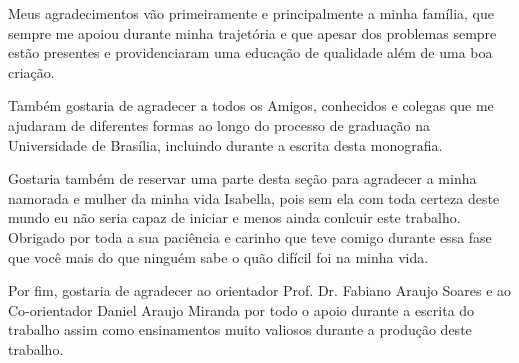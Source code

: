 \begin{agradecimentos}
Meus agradecimentos vão primeiramente e principalmente a minha família, que sempre me apoiou durante minha trajetória e que apesar dos problemas sempre estão presentes e providenciaram uma educação de qualidade além de uma boa criação.

Também gostaria de agradecer a todos os Amigos, conhecidos e colegas que me ajudaram de diferentes formas ao longo do processo de graduação na Universidade de Brasília, incluindo durante a escrita desta monografia.

Gostaria também de reservar uma parte desta seção para agradecer a minha namorada e mulher da minha vida Isabella, pois sem ela com toda certeza deste mundo eu não seria capaz de iniciar e menos ainda conlcuir este trabalho. Obrigado por toda a sua paciência e carinho que teve comigo durante essa fase que você mais do que ninguém sabe o quão difícil foi na minha vida.

Por fim, gostaria de agradecer ao orientador Prof. Dr. Fabiano Araujo Soares e ao Co-orientador Daniel Araujo Miranda por todo o apoio durante a escrita do trabalho assim como ensinamentos muito valiosos durante a produção deste trabalho.
\end{agradecimentos}
